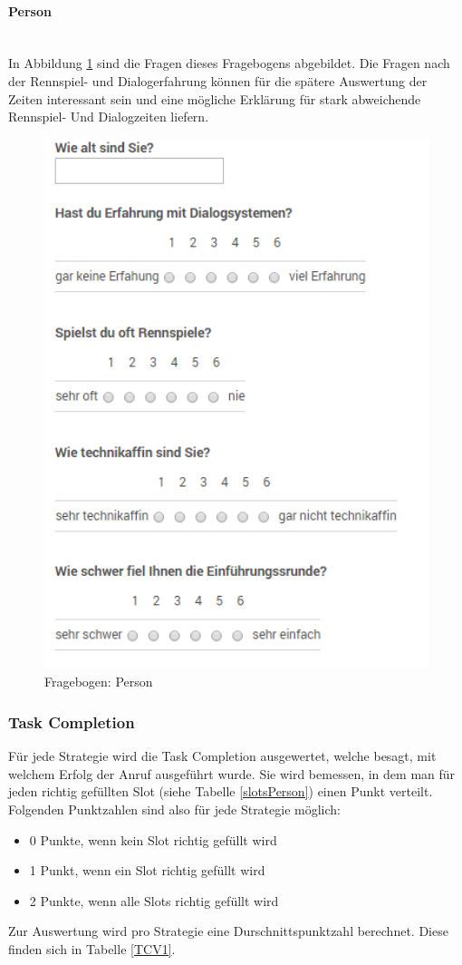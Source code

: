 \documentclass[12pt,a4paper]{scrartcl}
\begin{document}
\paragraph{Person}
~\\
\label{fbperson1}
In Abbildung \ref{fbperson} sind die Fragen dieses Fragebogens abgebildet.
Die Fragen nach der Rennspiel- und Dialogerfahrung können für die spätere Auswertung der Zeiten interessant sein und eine mögliche Erklärung für stark abweichende Rennspiel- Und Dialogzeiten liefern. 
\begin{figure}[htbp]
\begin{center}
\includegraphics[width=12cm]{fbperson.png}
\caption{Fragebogen: Person}
\label{fbperson}
\end{center}
\end{figure}

\subsubsection{Task Completion}
Für jede Strategie wird die Task Completion ausgewertet, welche besagt, mit welchem Erfolg der Anruf ausgeführt wurde. Sie wird bemessen, in dem man für jeden richtig gefüllten Slot (siehe Tabelle \ref{slotsPerson}) einen Punkt verteilt. Folgenden Punktzahlen sind also für jede Strategie möglich:
\begin{itemize}
\item 0 Punkte, wenn kein Slot richtig gefüllt wird
\item 1 Punkt, wenn ein Slot richtig gefüllt wird
\item 2 Punkte, wenn alle Slots richtig gefüllt wird
\end{itemize}
Zur Auswertung wird pro Strategie eine Durschnittspunktzahl berechnet. 
Diese finden sich in Tabelle \ref{TCV1}.
\end{document}
